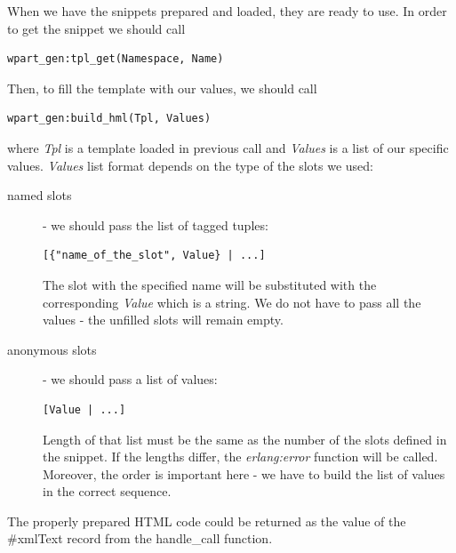When we have the snippets prepared and loaded, they are ready to use. 
In order to get the snippet we should call
\begin{verbatim}
wpart_gen:tpl_get(Namespace, Name)
\end{verbatim}
Then, to fill the template with our values, we should call
\begin{verbatim}
wpart_gen:build_hml(Tpl, Values)
\end{verbatim}
where {\it Tpl} is a template loaded in previous call and {\it Values} is a list of our specific values.
{\it Values} list format depends on the type of the slots we used:
\begin{description}
\item[named slots]- we should pass the list of tagged tuples:
\begin{verbatim}
[{"name_of_the_slot", Value} | ...]
\end{verbatim}
The slot with the specified name will be substituted with the corresponding {\it Value} which is a string. 
We do not have to pass all the values - the unfilled slots will remain empty.

\item[anonymous slots]- we should pass a list of values:
\begin{verbatim}
[Value | ...]
\end{verbatim}
Length of that list must be the same as the number of the slots defined in the snippet. 
If the lengths differ, the {\it erlang:error} function will be called.
Moreover, the order is important here - we have to build the list of values in the correct sequence.
\end{description}

The properly prepared HTML code could be returned as the value of the \#xmlText record from the handle\_call function.
